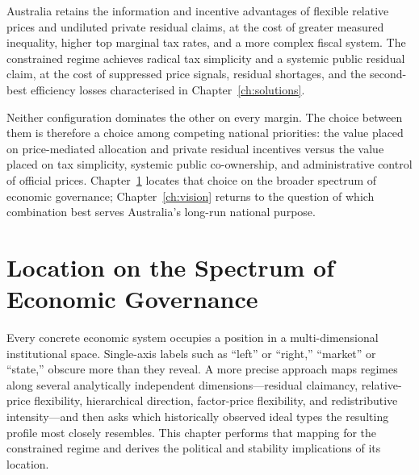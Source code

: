 \documentclass[12pt,anyside]{book}
\theoremstyle{definition}
\theoremstyle{plain}
\theoremstyle{remark}
\begin{document}
Australia retains the information and incentive advantages of flexible relative prices and undiluted private residual claims, at the cost of greater measured inequality, higher top marginal tax rates, and a more complex fiscal system. The constrained regime achieves radical tax simplicity and a systemic public residual claim, at the cost of suppressed price signals, residual shortages, and the second-best efficiency losses characterised in Chapter~\ref{ch:solutions}.

Neither configuration dominates the other on every margin. The choice between them is therefore a choice among competing national priorities: the value placed on price-mediated allocation and private residual incentives versus the value placed on tax simplicity, systemic public co-ownership, and administrative control of official prices. Chapter~\ref{ch:taxonomy} locates that choice on the broader spectrum of economic governance; Chapter~\ref{ch:vision} returns to the question of which combination best serves Australia’s long-run national purpose.

\chapter{Location on the Spectrum of Economic Governance}
\label{ch:taxonomy}

Every concrete economic system occupies a position in a multi-dimensional institutional space. Single-axis labels such as “left” or “right,” “market” or “state,” obscure more than they reveal. A more precise approach maps regimes along several analytically independent dimensions—residual claimancy, relative-price flexibility, hierarchical direction, factor-price flexibility, and redistributive intensity—and then asks which historically observed ideal types the resulting profile most closely resembles. This chapter performs that mapping for the constrained regime and derives the political and stability implications of its location.
\end{document}
